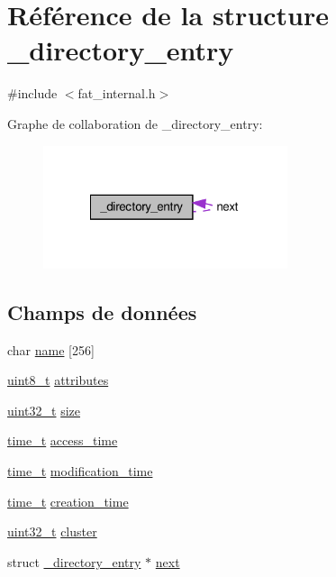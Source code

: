 \hypertarget{struct__directory__entry}{\section{Référence de la structure \-\_\-directory\-\_\-entry}
\label{struct__directory__entry}
}


{\ttfamily \#include $<$fat\-\_\-internal.\-h$>$}



Graphe de collaboration de \-\_\-directory\-\_\-entry\-:\nopagebreak
\begin{figure}[H]
\begin{center}
\leavevmode
\includegraphics[width=203pt]{struct__directory__entry__coll__graph}
\end{center}
\end{figure}
\subsection*{Champs de données}
\begin{DoxyCompactItemize}
\item 
char \hyperlink{struct__directory__entry_ac9142fdeb8e265f045fee1edf9608c78}{name} \mbox{[}256\mbox{]}
\item 
\hyperlink{kernel_2include_2types_8h_aba7bc1797add20fe3efdf37ced1182c5}{uint8\-\_\-t} \hyperlink{struct__directory__entry_a63da8f87e73a3eb30e55b2d405fa35d7}{attributes}
\item 
\hyperlink{kernel_2include_2types_8h_a33594304e786b158f3fb30289278f5af}{uint32\-\_\-t} \hyperlink{struct__directory__entry_a5d6f559c1b7ab2b5a64643073172cc25}{size}
\item 
\hyperlink{time_8h_aaaf414ca0598a3633e6e9161cbb5a58a}{time\-\_\-t} \hyperlink{struct__directory__entry_a27e1020c5262094ab3b58759da9660ae}{access\-\_\-time}
\item 
\hyperlink{time_8h_aaaf414ca0598a3633e6e9161cbb5a58a}{time\-\_\-t} \hyperlink{struct__directory__entry_a120c3a3857bd7892a0fc2e6644e6f188}{modification\-\_\-time}
\item 
\hyperlink{time_8h_aaaf414ca0598a3633e6e9161cbb5a58a}{time\-\_\-t} \hyperlink{struct__directory__entry_a95f0f5ef18bf17f332bd0dc352d62ac4}{creation\-\_\-time}
\item 
\hyperlink{kernel_2include_2types_8h_a33594304e786b158f3fb30289278f5af}{uint32\-\_\-t} \hyperlink{struct__directory__entry_a8c70d9d0c2b2557cba83fb827d5c6e90}{cluster}
\item 
struct \hyperlink{struct__directory__entry}{\-\_\-directory\-\_\-entry} $\ast$ \hyperlink{struct__directory__entry_a75001bda0d1d80e4ff5350ad69f83030}{next}
\end{DoxyCompactItemize}


